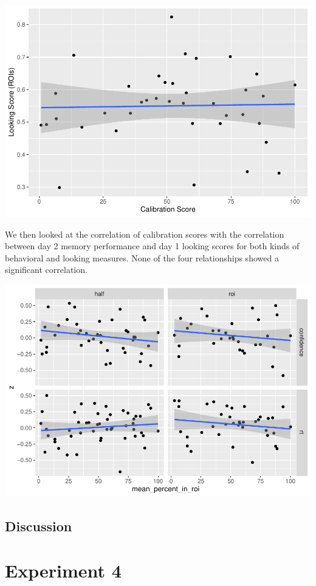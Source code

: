 \documentclass[
  man,floatsintext]{apa6}
\begin{document}
\includegraphics{manuscript_files/figure-latex/E3-cal Plot looking score (roi) by calibration-1.pdf}

We then looked at the correlation of calibration scores with the correlation between day 2 memory performance and day 1 looking scores for both kinds of behavioral and looking measures. None of the four relationships showed a significant correlation.

\includegraphics{manuscript_files/figure-latex/E3-cal Plot correlations with calibration.score-1.pdf}

\hypertarget{discussion-2}{%
\subsection{Discussion}\label{discussion-2}}

\hypertarget{experiment-4}{%
\section{Experiment 4}\label{experiment-4}}
\end{document}
